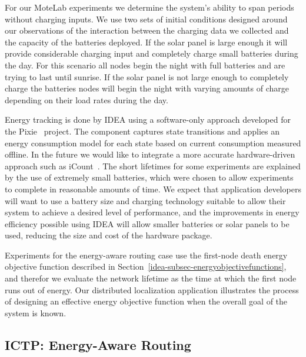 For our MoteLab experiments we determine the system's ability to span periods
without charging inputs. We use two sets of initial conditions designed
around our observations of the interaction between the charging data we
collected and the capacity of the batteries deployed. If the solar panel is
large enough it will provide considerable charging input and completely
charge small batteries during the day. For this scenario all nodes begin the
night with full batteries and are trying to last until sunrise. If the solar
panel is not large enough to completely charge the batteries nodes will begin
the night with varying amounts of charge depending on their load rates during
the day.

Energy tracking is done by IDEA using a software-only approach developed for
the Pixie~\cite{pixie-sensys08} project. The component captures state
transitions and applies an energy consumption model for each state based on
current consumption measured offline. In the future we would like to
integrate a more accurate hardware-driven approach such as
iCount~\cite{icount-spots08}. The short lifetimes for some experiments are
explained by the use of extremely small batteries, which were chosen to allow
experiments to complete in reasonable amounts of time. We expect that
application developers will want to use a battery size and charging
technology suitable to allow their system to achieve a desired level of
performance, and the improvements in energy efficiency possible using IDEA
will allow smaller batteries or solar panels to be used, reducing the size
and cost of the hardware package.

Experiments for the energy-aware routing case use the first-node death energy
objective function described in
Section~\ref{idea-subsec-energyobjectivefunctions}, and therefor we evaluate
the network lifetime as the time at which the first node runs out of energy.
Our distributed localization application illustrates the process of designing
an effective energy objective function when the overall goal of the system is
known.

\subsection{ICTP: Energy-Aware Routing}

